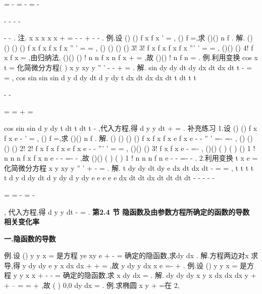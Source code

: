 =
-
=
-
=
-






-
-
-
-






-
-
. 
\textcolor{lyred}{注}.
x
x
x
x
x
+
=
-
-
+
-
-
. 
\textcolor{lyred}{例}.设
()
()
f
x
f
x
'
=
,
()
f
=,求
()()
n
f
. 
解.
()
()
()
()
f
x
f x f
x
f
x
''
'
=
=
,
()
()
()
()
3!
3!
f
x
f
x f
x
f
x
'''
'
=
=
, 
()()
()
4!
f
x
f
x
=
,由归纳法,
()()
()
!
n
n
f
x
n f
x
+
=
,故
()()
!
n
f
n
=
. 
\textcolor{lyred}{例}.利用变换
cos
x
t
=
化简微分方程(
)
x
y
xy
y
''
'
-
-
+
=
. 
解.
sin
dy
dy dt
dy
dx
dt dx
dt
t
-
=
=
\cdots 
,
cos
sin
sin
sin
d y
d
dy
dt
d y
dy
t
dx
dt
dx
dx
dt
t
dt
t
t


-
-


=
=
\cdots 
+
\cdots 
\cdots 
=








cos
sin
sin
d y
dy
t
dt
t
dt
t
\cdots 
-
\cdots 
,代入方程,得
d y
y
dt
+
=
. 
\textcolor{lyred}{补充练习 }
1.设
()
()
f x
f
x
e
-
'
=
,
()
f
=,求
()()
n
f
. 
解.
()
()
()
()
f x
f x
f
x
e
f
x
e
-
-
''
'
=-
\cdots 
=-
,
()
()
()
()
2!
2!
f x
f x
f
x
e
f
x
e
-
-
'''
'
=
\cdots 
=
, 
()()
()
3!
f x
f
x
e
-
=-
,
()()
(
)
(
)
()
1 !
n
n
n f x
f
x
n
e
-
-\cdots 
=-
-
,故
()()
(
)
(
)
1 !
n
n
n
f
n
e
-
-
=-
-
. 
2.利用变换
t
x
e
=
化简微分方程
x y
xy
y
''
'
+
-
=
. 
解.
t
dy
dy dt
dy e
dx
dt dx
dt
-
=
=
,
t
t
t
t
t
d y
d
dy
dt
d y
dy
d y
dy
e
e
e
e
e
dx
dt dt
dx
dt
dt
dt
dt
-
-
-
-
-






=
=
-
=
-












, 
代入方程,得
d y
y
dt
-
=
. 
\vspace{6pt}
{\large \bfseries \textcolor{lyred}{第2.4 节 隐函数及由参数方程所确定的函数的导数 相关变化率}}

\vspace{4pt}
{\bfseries \textcolor{lyred}{一.隐函数的导数}}

\textcolor{lyred}{例}.设
()
y
y x
=
是方程
ye
xy
e
+
-
=
确定的隐函数,求dy
dx . 
解.方程两边对x 求导,得
y dy
dy
e
y
x
dx
dx
+
+
=
,故
y
dy
y
dx
x
e
=-
+
. 
\textcolor{lyred}{例}.设
()
y
y x
=
是方程
y
y
x
x
+
-
-
=
确定的隐函数,求
x
dy
dx
=
. 
解.
dy
dy
dy
x
y
x
dx
dx
dx
y
+
+
--
=
\Rightarrow 
=
+
,故
(
)
0,0
dy
dx
=
. 
\textcolor{lyred}{例}.求椭圆
x
y
+
=在
2,







